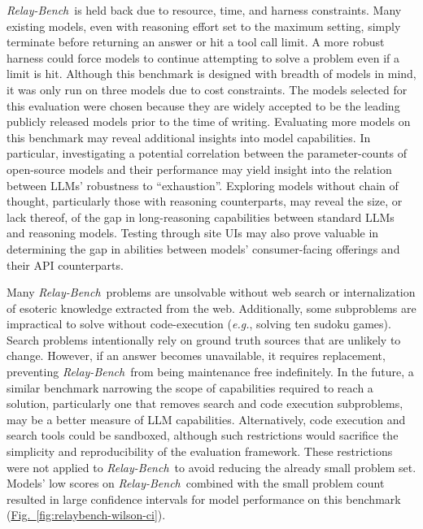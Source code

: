 \documentclass[10pt,letterpaper,twocolumn]{article}
\newcommand{\figref}[1]{\hyperref[#1]{\textcolor{customorange}{Fig.~\ref*{#1}}}}
\newcommand{\relaybench}{\texorpdfstring{{\textit{Relay-Bench}}}{Relay-Bench}}
\begin{document}
\relaybench\ is held back due to resource, time, and harness constraints. Many existing models, even with reasoning effort set to the maximum setting, simply terminate before returning an answer or hit a tool call limit. A more robust harness could force models to continue attempting to solve a problem even if a limit is hit. Although this benchmark is designed with breadth of models in mind, it was only run on three models due to cost constraints. The models selected for this evaluation were chosen because they are widely accepted to be the leading publicly released models prior to the time of writing\footnotemark. Evaluating more models on this benchmark may reveal additional insights into model capabilities. In particular, investigating a potential correlation between the parameter-counts of open-source models and their performance may yield insight into the relation between LLMs' robustness to ``exhaustion''. Exploring models without chain of thought, particularly those with reasoning counterparts, may reveal the size, or lack thereof, of the gap in long-reasoning capabilities between standard LLMs and reasoning models. Testing through site UIs may also prove valuable in determining the gap in abilities between models' consumer-facing offerings and their API counterparts.

Many \relaybench\ problems are unsolvable without web search or internalization of esoteric knowledge extracted from the web. Additionally, some subproblems are impractical to solve without code-execution (\textit{e.g.}, solving ten sudoku games). Search problems intentionally rely on ground truth sources that are unlikely to change. However, if an answer becomes unavailable, it requires replacement, preventing \relaybench\ from being maintenance free indefinitely. In the future, a similar benchmark narrowing the scope of capabilities required to reach a solution, particularly one that removes search and code execution subproblems, may be a better measure of LLM capabilities. Alternatively, code execution and search tools could be sandboxed, although such restrictions would sacrifice the simplicity and reproducibility of the evaluation framework. These restrictions were not applied to \relaybench\ to avoid reducing the already small problem set. Models' low scores on \relaybench\ combined with the small problem count resulted in large confidence intervals for model performance on this benchmark (\figref{fig:relaybench-wilson-ci}).
\end{document}
